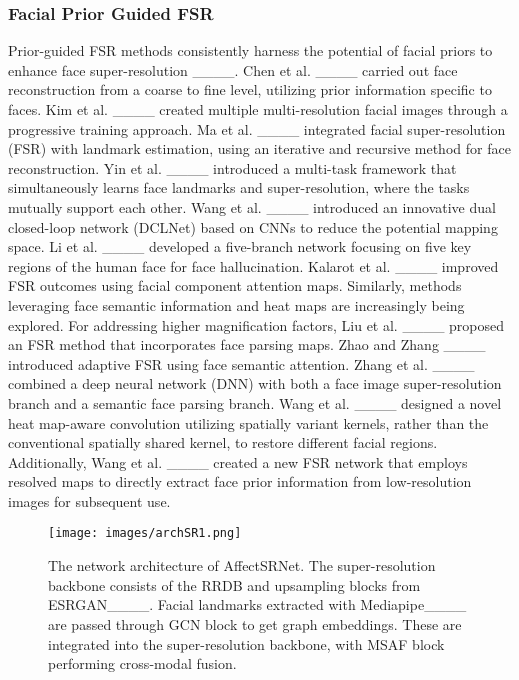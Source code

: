 \subsubsection{Facial Prior Guided FSR}
Prior-guided FSR methods consistently harness the potential of facial priors to enhance face super-resolution ____. Chen et al. ____ carried out face reconstruction from a coarse to fine level, utilizing prior information specific to faces. Kim et al. ____ created multiple multi-resolution facial images through a progressive training approach. Ma et al. ____ integrated facial super-resolution (FSR) with landmark estimation, using an iterative and recursive method for face reconstruction. Yin et al. ____ introduced a multi-task framework that simultaneously learns face landmarks and super-resolution, where the tasks mutually support each other. Wang et al. ____ introduced an innovative dual closed-loop network (DCLNet) based on CNNs to reduce the potential mapping space. Li et al. ____ developed a five-branch network focusing on five key regions of the human face for face hallucination. Kalarot et al. ____ improved FSR outcomes using facial component attention maps. Similarly, methods leveraging face semantic information and heat maps are increasingly being explored. For addressing higher magnification factors, Liu et al. ____ proposed an FSR method that incorporates face parsing maps. Zhao and Zhang ____ introduced adaptive FSR using face semantic attention. Zhang et al. ____ combined a deep neural network (DNN) with both a face image super-resolution branch and a semantic face parsing branch. Wang et al. ____ designed a novel heat map-aware convolution utilizing spatially variant kernels, rather than the conventional spatially shared kernel, to restore different facial regions. Additionally, Wang et al. ____ created a new FSR network that employs resolved maps to directly extract face prior information from low-resolution images for subsequent use.










\begin{figure*}
    \centering
    \texttt{[image: images/archSR1.png]}
    \caption{\label{arc} The network architecture of AffectSRNet. The super-resolution backbone consists of the RRDB and upsampling blocks from ESRGAN____. Facial landmarks extracted with Mediapipe____ are passed through GCN block to get graph embeddings. These are integrated into the super-resolution backbone, with MSAF block performing cross-modal fusion.}
   
\end{figure*}